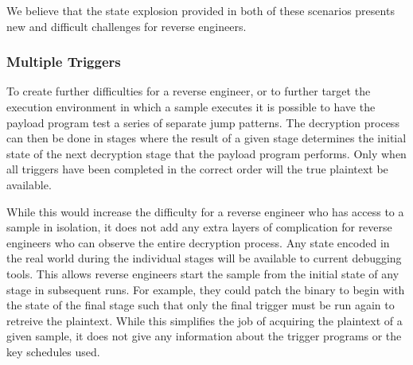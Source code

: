 We believe that the state explosion provided in both of these scenarios 
presents new and difficult challenges for reverse engineers. 


\subsubsection{Multiple Triggers}
To create further difficulties for a reverse engineer, or to further target
the execution environment in which a sample executes it is possible
to have the payload program test a series of separate jump patterns. The decryption
process can then be done in stages where the result of a given stage determines 
the initial state of the next decryption stage that the payload program 
performs. Only when all triggers have been completed in the correct order will
the true plaintext be available. 

While this would increase the difficulty for a reverse engineer who has access
to a sample in isolation, it  does not add any extra layers of complication 
for reverse engineers who can observe the entire decryption process. Any state 
encoded in the real world during the individual stages will be available to current 
debugging tools. This allows reverse engineers start the sample from the initial
state of any stage in subsequent runs. For example, they could patch the 
binary to begin with the state of the final stage such that only the final 
trigger must be run again to retreive the plaintext. While this simplifies the 
job of acquiring the plaintext of a given \speculake sample, it does not give any 
information about the trigger programs or the key schedules used. 


